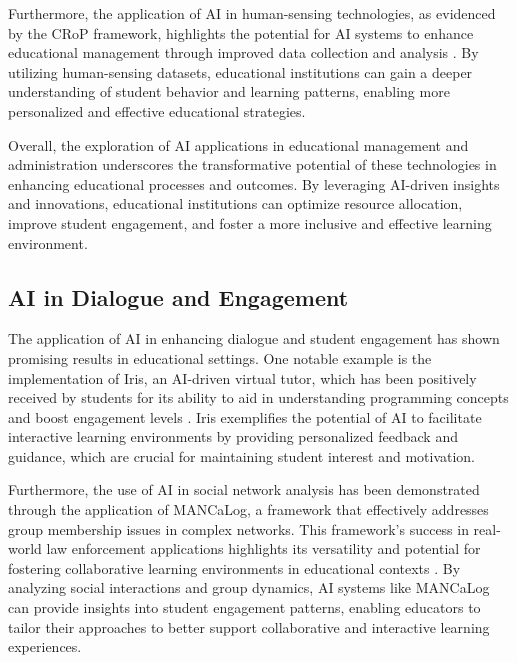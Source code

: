 Furthermore, the application of AI in human-sensing technologies, as evidenced by the CRoP framework, highlights the potential for AI systems to enhance educational management through improved data collection and analysis \cite{kaur2024cropcontextwiserobuststatic}. By utilizing human-sensing datasets, educational institutions can gain a deeper understanding of student behavior and learning patterns, enabling more personalized and effective educational strategies.

Overall, the exploration of AI applications in educational management and administration underscores the transformative potential of these technologies in enhancing educational processes and outcomes. By leveraging AI-driven insights and innovations, educational institutions can optimize resource allocation, improve student engagement, and foster a more inclusive and effective learning environment.


\subsection{AI in Dialogue and Engagement} \label{subsec:AI in Dialogue and Engagement}



The application of AI in enhancing dialogue and student engagement has shown promising results in educational settings. One notable example is the implementation of Iris, an AI-driven virtual tutor, which has been positively received by students for its ability to aid in understanding programming concepts and boost engagement levels \cite{bassner2024irisaidrivenvirtualtutor}. Iris exemplifies the potential of AI to facilitate interactive learning environments by providing personalized feedback and guidance, which are crucial for maintaining student interest and motivation.



Furthermore, the use of AI in social network analysis has been demonstrated through the application of MANCaLog, a framework that effectively addresses group membership issues in complex networks. This framework's success in real-world law enforcement applications highlights its versatility and potential for fostering collaborative learning environments in educational contexts \cite{shakarian2022reasoningcomplexnetworkslogic}. By analyzing social interactions and group dynamics, AI systems like MANCaLog can provide insights into student engagement patterns, enabling educators to tailor their approaches to better support collaborative and interactive learning experiences.



